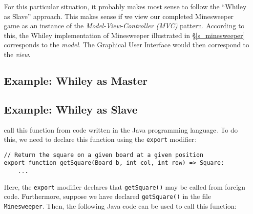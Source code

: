 For this particular situation, it probably makes most sense to follow the ``Whiley as Slave'' approach.  This makes sense if we view our completed Minesweeper game as an instance of the {\em Model-View-Controller (MVC)} pattern.  According to this, the Whiley implementation of Minesweeper illustrated in \S\ref{s_minesweeper} corresponds to the {\em model}.  The Graphical User Interface would then correspond to the {\em view}.

\subsection{Example: Whiley as Master}

\subsection{Example: Whiley as Slave}

call this function from code written in the Java programming language.  To do this, we need to declare this function using the \lstinline{export} modifier:

\begin{lstlisting}
// Return the square on a given board at a given position
export function getSquare(Board b, int col, int row) => Square:
    ...
\end{lstlisting}

Here, the \lstinline{export} modifier declares that \lstinline{getSquare()} may be called from foreign code.  Furthermore, suppose we have declared \lstinline{getSquare()} in the file \lstinline{Minesweeper}.  Then, the following Java code can be used to call this function:

